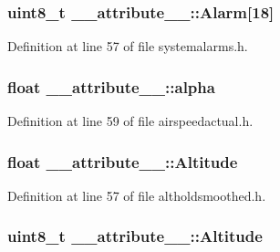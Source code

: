 \hypertarget{struct____attribute_____ab7ffe995d8b2bbcbec0b627c9fcb8d5c}{
\subsubsection[{\-Alarm}]{\setlength{\rightskip}{0pt plus 5cm}uint8\-\_\-t {\bf \-\_\-\-\_\-attribute\-\_\-\-\_\-\-::\-Alarm}\mbox{[}18\mbox{]}}}\label{struct____attribute_____ab7ffe995d8b2bbcbec0b627c9fcb8d5c}


\-Definition at line 57 of file systemalarms.\-h.

\hypertarget{struct____attribute_____aed2862418ac6d8e0ca98131645e31c3b}{
\subsubsection[{alpha}]{\setlength{\rightskip}{0pt plus 5cm}float {\bf \-\_\-\-\_\-attribute\-\_\-\-\_\-\-::alpha}}}\label{struct____attribute_____aed2862418ac6d8e0ca98131645e31c3b}


\-Definition at line 59 of file airspeedactual.\-h.

\hypertarget{struct____attribute_____a6df65b8c764a5d5cf17e244905eb25af}{
\subsubsection[{\-Altitude}]{\setlength{\rightskip}{0pt plus 5cm}float {\bf \-\_\-\-\_\-attribute\-\_\-\-\_\-\-::\-Altitude}}}\label{struct____attribute_____a6df65b8c764a5d5cf17e244905eb25af}


\-Definition at line 57 of file altholdsmoothed.\-h.

\hypertarget{struct____attribute_____afac38c834695bb4a2f2577b7ba2e0b21}{
\subsubsection[{\-Altitude}]{\setlength{\rightskip}{0pt plus 5cm}uint8\-\_\-t {\bf \-\_\-\-\_\-attribute\-\_\-\-\_\-\-::\-Altitude}}}\label{struct____attribute_____afac38c834695bb4a2f2577b7ba2e0b21}


